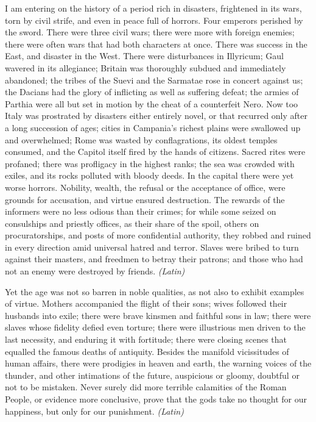 I am entering on the history of a period rich in disasters, frightened in its wars, torn by civil strife, and even in peace full of horrors. Four emperors perished by the sword. There were three civil wars; there were more with foreign enemies; there were often wars that had both characters at once. There was success in the East, and disaster in the West. There were disturbances in Illyricum; Gaul wavered in its allegiance; Britain was thoroughly subdued and immediately abandoned; the tribes of the Suevi and the Sarmatae rose in concert against us; the Dacians had the glory of inflicting as well as suffering defeat; the armies of Parthia were all but set in motion by the cheat of a counterfeit Nero. Now too Italy was prostrated by disasters either entirely novel, or that recurred only after a long succession of ages; cities in Campania's richest plains were swallowed up and overwhelmed; Rome was wasted by conflagrations, its oldest temples consumed, and the Capitol itself fired by the hands of citizens. Sacred rites were profaned; there was profligacy in the highest ranks; the sea was crowded with exiles, and its rocks polluted with bloody deeds. In the capital there were yet worse horrors. Nobility, wealth, the refusal or the acceptance of office, were grounds for accusation, and virtue ensured destruction. The rewards of the informers were no less odious than their crimes; for while some seized on consulships and priestly offices, as their share of the spoil, others on procuratorships, and posts of more confidential authority, they robbed and ruined in every direction amid universal hatred and terror. Slaves were bribed to turn against their masters, and freedmen to betray their patrons; and those who had not an enemy were destroyed by friends. \emph{(Latin)}


Yet the age was not so barren in noble qualities, as not also to exhibit examples of virtue. Mothers accompanied the flight of their sons; wives followed their husbands into exile; there were brave kinsmen and faithful sons in law; there were slaves whose fidelity defied even torture; there were illustrious men driven to the last necessity, and enduring it with fortitude; there were closing scenes that equalled the famous deaths of antiquity. Besides the manifold vicissitudes of human affairs, there were prodigies in heaven and earth, the warning voices of the thunder, and other intimations of the future, auspicious or gloomy, doubtful or not to be mistaken. Never surely did more terrible calamities of the Roman People, or evidence more conclusive, prove that the gods take no thought for our happiness, but only for our punishment. \emph{(Latin)}

